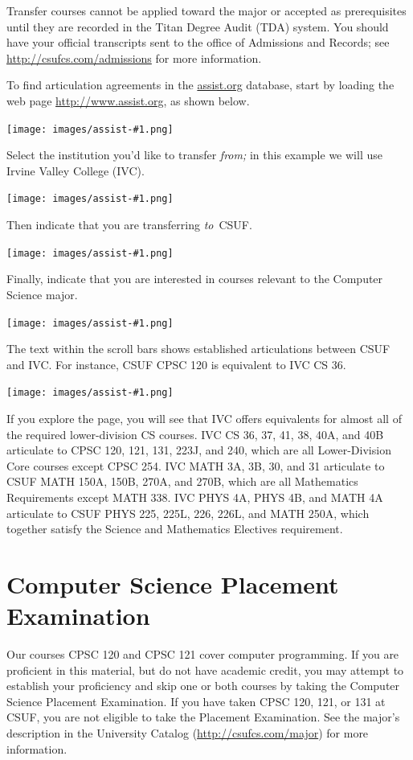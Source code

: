\documentclass{book}
\newcommand{\CampusName}{CSUF}
\newcommand{\shrunkurl}[1]{\url{http://csufcs.com/#1}}
\begin{document}
Transfer courses cannot be applied toward the major or accepted as
prerequisites until they are recorded in the Titan Degree Audit (TDA)
system. You should have your official transcripts sent to the office
of Admissions and Records; see \shrunkurl{admissions} for more
information.

To find articulation agreements in the \url{assist.org} database,
start by loading the web page \url{http://www.assist.org}, as shown
below.

\newcommand{\AssistOrgScreenshot}[1]{
  \begin{center}
    \texttt{[image: images/assist-\#1.png]}
  \end{center}
}

\AssistOrgScreenshot{1}

Select the institution you'd like to transfer \emph{from;} in this
example we will use Irvine Valley College (IVC).

\AssistOrgScreenshot{2}

Then indicate that you are transferring \emph{to}~\CampusName.

\AssistOrgScreenshot{3}

Finally, indicate that you are interested in courses relevant to the
Computer Science major.

\AssistOrgScreenshot{4}

The text within the scroll bars shows established articulations
between CSUF and IVC. For instance, CSUF CPSC 120 is equivalent to IVC
CS 36.

\AssistOrgScreenshot{5}

If you explore the page, you will see that IVC offers equivalents for
almost all of the required lower-division CS courses. IVC CS 36, 37,
41, 38, 40A, and 40B articulate to CPSC 120, 121, 131, 223J, and 240,
which are all Lower-Division Core courses except CPSC 254. IVC MATH
3A, 3B, 30, and 31 articulate to CSUF MATH 150A, 150B, 270A, and 270B,
which are all Mathematics Requirements except MATH 338. IVC PHYS 4A,
PHYS 4B, and MATH 4A articulate to CSUF PHYS 225, 225L, 226, 226L, and
MATH 250A, which together satisfy the Science and Mathematics
Electives requirement.

\section{Computer Science Placement Examination}
\label{section:placement}
 Our courses CPSC 120 and CPSC 121 cover
computer programming. If you are proficient in this material, but do
not have academic credit, you may attempt to establish your
proficiency and skip one or both courses by taking the Computer
Science Placement Examination. If you have taken CPSC 120, 121, or 131
at \CampusName, you are not eligible to take the Placement
Examination. See the major's description in the University Catalog
(\shrunkurl{major}) for more information.
\end{document}
